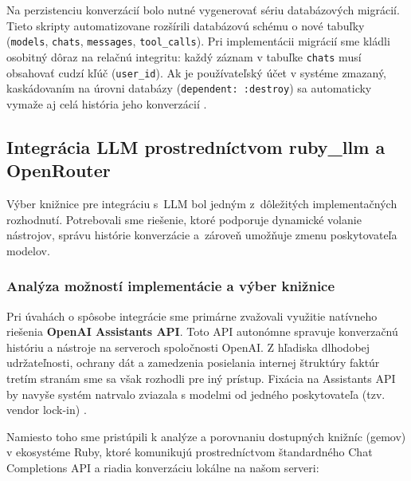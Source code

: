 Na perzistenciu konverzácií bolo nutné vygenerovať sériu databázových migrácií.
Tieto skripty automatizovane rozšírili databázovú schému o nové tabuľky (\texttt{models},
\texttt{chats}, \texttt{messages}, \texttt{tool\_calls}). Pri implementácii
migrácií sme kládli osobitný dôraz na relačnú integritu: každý záznam v tabuľke \texttt{chats}
musí obsahovať cudzí kľúč (\texttt{user\_id}). Ak je používateľský účet v
systéme zmazaný, kaskádovaním na úrovni databázy (\texttt{dependent: :destroy})
sa automaticky vymaže aj celá história jeho konverzácií \cite{ruby2025}.

\subsection{Integrácia LLM prostredníctvom ruby\_llm a OpenRouter}
Výber knižnice pre integráciu s~LLM bol jedným z~dôležitých implementačných
rozhodnutí. Potrebovali sme riešenie, ktoré podporuje dynamické volanie
nástrojov, správu histórie konverzácie a~zároveň umožňuje zmenu poskytovateľa modelov.

\subsubsection{Analýza možností implementácie a výber knižnice}

Pri úvahách o spôsobe integrácie sme primárne zvažovali využitie natívneho
riešenia \textbf{OpenAI Assistants API}. Toto API autonómne spravuje konverzačnú
históriu a nástroje na serveroch spoločnosti OpenAI. Z hľadiska dlhodobej udržateľnosti,
ochrany dát a zamedzenia posielania internej štruktúry faktúr tretím stranám sme
sa však rozhodli pre iný prístup. Fixácia na Assistants API by navyše systém natrvalo
zviazala s modelmi od jedného poskytovateľa (tzv. vendor lock-in)
\cite{atkinson2025}.

Namiesto toho sme pristúpili k analýze a porovnaniu dostupných knižníc (gemov) v
ekosystéme Ruby, ktoré komunikujú prostredníctvom štandardného Chat Completions API
a riadia konverzáciu lokálne na našom serveri:


